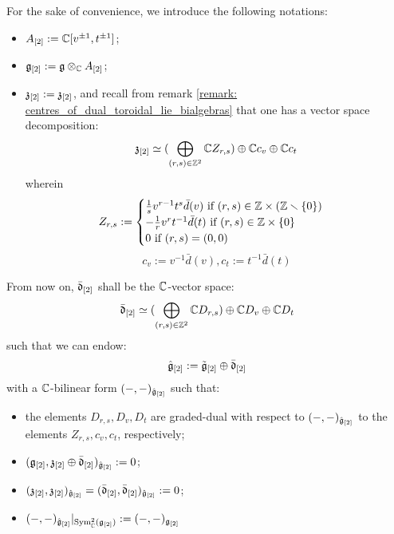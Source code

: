             \begin{convention} 
                For the sake of convenience, we introduce the following notations:
                \begin{itemize}
                    \item $A_{[2]} := \mathbb{C}[v^{\pm 1}, t^{\pm 1}]$;
                    \item $\g_{[2]} := \g \tensor_{\bbC} A_{[2]}$;
                    \item $\mathfrak{z}_{[2]} := \mathfrak{z}_{[2]}$, and recall from remark \ref{remark: centres_of_dual_toroidal_lie_bialgebras} that one has a vector space decomposition:
                        $$\mathfrak{z}_{[2]} \simeq ( \bigoplus_{(r, s) \in \mathbb{Z}^2} \mathbb{C} Z_{r, s} ) \oplus \mathbb{C} c_v \oplus \mathbb{C} c_t$$
                    wherein
                        $$
                            Z_{r, s} :=
                            \begin{cases}
                                \text{$\frac1s v^{r - 1} t^s \bar{d}(v)$ if $(r, s) \in \Z \x (\Z \setminus \{0\})$}
                                \\
                                \text{$-\frac1r v^r t^{-1} \bar{d}(t)$ if $(r, s) \in \Z \x \{0\}$}
                                \\
                                \text{$0$ if $(r, s) = (0, 0)$}
                            \end{cases}
                        $$
                        $$c_v := v^{-1} \bar{d}(v), c_t := t^{-1} \bar{d}(t)$$
                \end{itemize}
            \end{convention}
            \begin{convention} \label{conv: orthogonal_complement_of_toroidal_centres}
                From now on, $\bar{\mathfrak{d}}_{[2]}$ shall be the $\mathbb{C}$-vector space:
                    $$\bar{\mathfrak{d}}_{[2]} \simeq ( \bigoplus_{(r, s) \in \mathbb{Z}^2} \mathbb{C} D_{r, s} ) \oplus \mathbb{C} D_v \oplus \mathbb{C} D_t$$
                such that we can endow:
                    $$\hat{\mathfrak{g}}_{[2]} := \tilde{\mathfrak{g}}_{[2]}\oplus \bar{\mathfrak{d}}_{[2]}$$
                with a $\mathbb{C}$-bilinear form $(-, -)_{\hat{\mathfrak{g}}_{[2]}}$ such that:
                \begin{itemize}
                    \item the elements $D_{r, s}, D_v, D_t$ are graded-dual with respect to $(-, -)_{\hat{\mathfrak{g}}_{[2]}}$ to the elements $Z_{r, s}, c_v, c_t$, respectively;
                    \item $(\mathfrak{g}_{[2]}, \mathfrak{z}_{[2]} \oplus \bar{\mathfrak{d}}_{[2]})_{\hat{\mathfrak{g}}_{[2]}} := 0$;
                    \item $(\mathfrak{z}_{[2]}, \mathfrak{z}_{[2]})_{\hat{\mathfrak{g}}_{[2]}} = (\bar{\mathfrak{d}}_{[2]}, \bar{\mathfrak{d}}_{[2]})_{\hat{\mathfrak{g}}_{[2]}} := 0$;
                    \item $(-, -)_{\hat{\mathfrak{g}}_{[2]}}|_{\mathrm{Sym}^2_{\mathbb{C}}(\mathfrak{g}_{[2]})} := (-, -)_{\mathfrak{g}_{[2]}}$
                \end{itemize}
            \end{convention}
